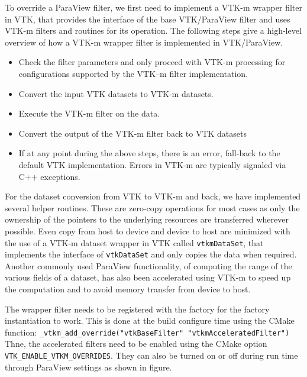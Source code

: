 To override a ParaView filter, we first need to implement a VTK-m wrapper filter in VTK, that provides the interface of the base VTK/ParaView filter and uses VTK-m filters and routines for its operation. The following steps give a high-level overview of how a VTK-m wrapper filter is implemented in VTK/ParaView.
\begin{itemize}
    \item Check the filter parameters and only proceed with VTK-m processing for configurations supported by the VTK–m filter implementation.
    \item Convert the input VTK datasets to VTK-m datasets. 
    \item Execute the VTK-m filter on the data.
    \item Convert the output of the VTK-m filter back to VTK datasets
    \item If at any point during the above steps, there is an error, fall-back to the default VTK implementation. Errors in VTK-m are typically signaled via C++ exceptions.
\end{itemize}

For the dataset conversion from VTK to VTK-m and back, we have implemented several helper routines. These are zero-copy operations for most cases as only the ownership of the pointers to the underlying resources are transferred wherever possible. Even copy from host to device and device to host are minimized with the use of a VTK-m dataset wrapper in VTK called \texttt{vtkmDataSet}, that implements the interface of \texttt{vtkDataSet} and only copies the data when required. Another commonly used ParaView functionality, of computing the range of the various fields of a dataset, has also been accelerated using VTK-m to speed up the computation and to avoid memory transfer from device to host.

The wrapper filter needs to be registered with the factory for the factory instantiation to work. This is done at the build configure time using the CMake function:
\texttt{\_vtkm\_add\_override("vtkBaseFilter" "vtkmAcceleratedFilter")} Thne, the accelerated filters need to be enabled using the CMake option \texttt{VTK\_ENABLE\_VTKM\_OVERRIDES}. They can also be turned on or off during run time through ParaView settings as shown in figure.

